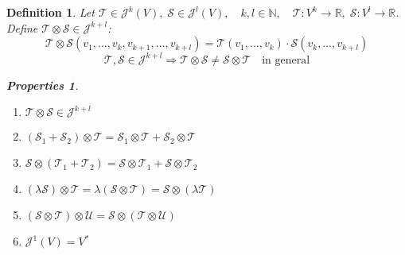 \documentclass[11pt]{article}
\def\RR{\mathbb{R}}
\def\NN{\mathbb{N}}
\newtheorem{definition}{Definition}[section]
\newtheorem*{properties}{Properties}
\begin{document}
\begin{definition}
Let $\mathcal{T} \in \mathcal{J}^k(V), \; \mathcal{S} \in  \mathcal{J}^l{}(V), \quad k,l \in \NN, \quad \mathcal{T}:V^k\rightarrow \RR, \;\mathcal{S}:V^l\rightarrow \RR$. Define $\mathcal{T} \otimes \mathcal{S} \in \mathcal{J}^{k+l}$:
\[\mathcal{T} \otimes \mathcal{S} (v_1,\dots,v_k, v_{k+1},\dots , v_{k+l}) = \mathcal{T}(v_1,\dots,v_k) \cdot \mathcal{S} (v_k,\dots, v_{k+l})\]
\[\mathcal{T}, \mathcal{S} \in \mathcal{J}^{k+l} \Rightarrow \mathcal{T} \otimes \mathcal{S} \neq \mathcal{S} \otimes \mathcal{T}\quad \text{in general}\]
\begin{properties}\quad \\
\begin{enumerate}
\item $\mathcal{T} \otimes \mathcal{S} \in \mathcal{J}^{k+l}$
\item$(\mathcal{S}_1 + \mathcal{S}_2)\otimes\mathcal{T} = \mathcal{S}_1\otimes \mathcal{T} + \mathcal{S}_2 \otimes\mathcal{T}$
\item $\mathcal{S}\otimes (\mathcal{T}_1 + \mathcal{T}_2) = \mathcal{S}\otimes \mathcal{T}_1 + \mathcal{S}\otimes \mathcal{T}_2$
\item $(\lambda\mathcal{S})\otimes\mathcal{T} = \lambda(\mathcal{S}\otimes\mathcal{T}) = \mathcal{S}\otimes(\lambda\mathcal{T})$
\item $(\mathcal{S}\otimes\mathcal{T})\otimes\mathcal{U} = \mathcal{S}\otimes(\mathcal{T}\otimes\mathcal{U})$
\item $\mathcal{J}^1(V) = V^{*}$
\end{enumerate}
\end{properties}
\end{definition}
\end{document}

